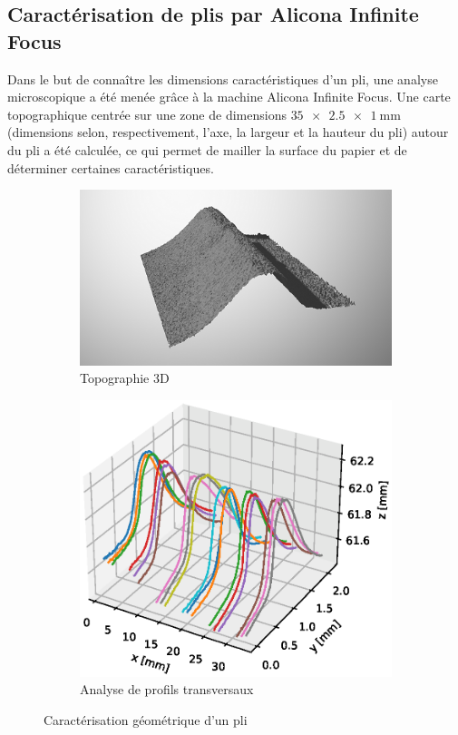 \documentclass[a4paper, 11pt]{article}
\begin{document}
	\subsection{Caractérisation de plis par Alicona Infinite Focus}
		\label{section:Alicona}
		Dans le but de connaître les dimensions caractéristiques d'un pli, une analyse microscopique a été menée grâce à la machine Alicona Infinite Focus. Une carte topographique centrée sur une zone de dimensions $\SI{35 x 2.5 x 1}{\milli\meter}$ (dimensions selon, respectivement, l'axe, la largeur et la hauteur du pli) autour du pli a été calculée, ce qui permet de mailler la surface du papier et de déterminer certaines caractéristiques.
		\begin{figure}\centering
			\begin{subfigure}[b]{.54\linewidth}
				\includegraphics[width=\linewidth]{pli_01_3d_small.png}
				\caption{Topographie 3D}
			\end{subfigure}
			\begin{subfigure}[b]{.44\linewidth}
				\includegraphics[width=\linewidth]{profiles.eps}
				\caption{Analyse de profils transversaux}
			\end{subfigure}
			\caption{\label{fig:caracterisation_pli}Caractérisation géométrique d'un pli}
		\end{figure}
\end{document}

